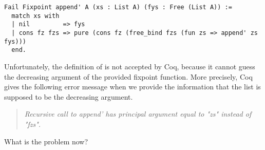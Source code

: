 \begin{verbatim}
Fail Fixpoint append' A (xs : List A) (fys : Free (List A)) :=
  match xs with
  | nil         => fys
  | cons fz fzs => pure (cons fz (free_bind fzs (fun zs => append' zs fys)))
  end.
\end{verbatim}

Unfortunately, the definition of  is not accepted by Coq, because it cannot guess the decreasing argument of the provided fixpoint function.
More precisely, Coq gives the following error message when we provide the information that the list  is supposed to be the decreasing argument.

\begin{quote}
\emph{Recursive call to append' has principal argument equal to "zs" instead of "fzs".}
\end{quote}

What is the problem now?

